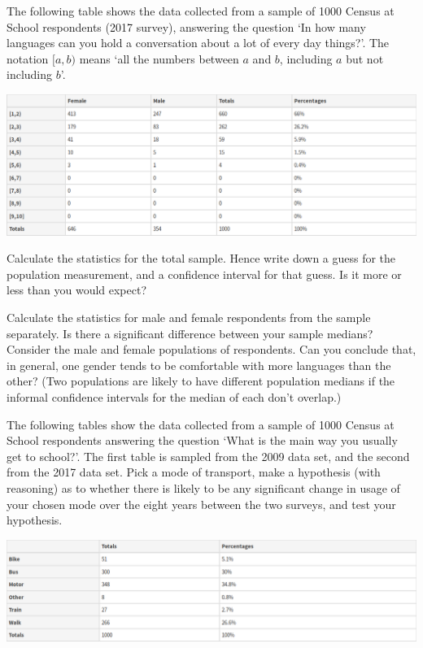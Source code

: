 \begin{questions}
  \question The following table shows the data collected from a sample of 1000 Census at School respondents (2017 survey),
            answering the question `In how many languages can you hold a conversation about a lot of every day things?'.
            The notation $ [a,b) $ means `all the numbers between $ a $ and $ b $, including $ a $ but not including $ b $'.
            \begin{center}
              \includegraphics[width=\textwidth]{stats-languages}
            \end{center}
    \begin{parts}
      \item Calculate the statistics for the total sample. Hence write down a guess for the population
            measurement, and a confidence interval for that guess. Is it more or less than you would expect?
      \item Calculate the statistics for male and female respondents from the sample separately. Is there
            a significant difference between your sample medians? Consider the male and female populations
            of respondents. Can you conclude that, in general, one gender tends to be comfortable with
            more languages than the other? (Two populations are likely to have different population medians
            if the informal confidence intervals for the median of each don't overlap.)
    \end{parts}
  \question The following tables show the data collected from a sample of 1000 Census at School respondents answering the question `What
            is the main way you usually get to school?'. The first table is sampled from the 2009 data set, and the second from the 2017
            data set. Pick a mode of transport, make a hypothesis (with reasoning) as to whether there is likely to be any significant
            change in usage of your chosen mode over the eight years between the two surveys, and test your hypothesis.
            \begin{center}
              \includegraphics[width=\textwidth]{stats-transport2009}

\end{center}
\end{questions}
